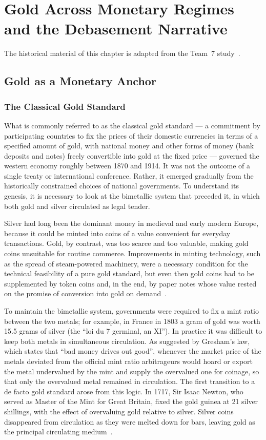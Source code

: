 \chapter{Gold Across Monetary Regimes and the Debasement Narrative}
\label{ch:gold-regimes}
The historical material of this chapter is adapted from the Team~7 study~\cite{team7}.

\section{Gold as a Monetary Anchor}
\subsection{The Classical Gold Standard}
What is commonly referred to as the classical gold standard --- a commitment by participating countries to fix the prices of their domestic currencies in terms of a specified amount of gold, with national money and other forms of money (bank deposits and notes) freely convertible into gold at the fixed price --- governed the western economy roughly between 1870 and 1914. It was not the outcome of a single treaty or international conference. Rather, it emerged gradually from the historically constrained choices of national governments. To understand its genesis, it is necessary to look at the bimetallic system that preceded it, in which both gold and silver circulated as legal tender.
 
Silver had long been the dominant money in medieval and early modern Europe, because it could be minted into coins of a value convenient for everyday transactions. Gold, by contrast, was too scarce and too valuable, making gold coins unsuitable for routine commerce. Improvements in minting technology, such as the spread of steam-powered machinery, were a necessary condition for the technical feasibility of a pure gold standard, but even then gold coins had to be supplemented by token coins and, in the end, by paper notes whose value rested on the promise of conversion into gold on demand~\cite{Eichengreen1996}.
 
To maintain the bimetallic system, governments were required to fix a mint ratio between the two metals; for example, in France in 1803 a gram of gold was worth 15.5 grams of silver (the ``loi du 7 germinal, an XI''). In practice it was difficult to keep both metals in simultaneous circulation. As suggested by Gresham's law, which states that ``bad money drives out good'', whenever the market price of the metals deviated from the official mint ratio arbitrageurs would hoard or export the metal undervalued by the mint and supply the overvalued one for coinage, so that only the overvalued metal remained in circulation. The first transition to a de facto gold standard arose from this logic. In 1717, Sir Isaac Newton, who served as Master of the Mint for Great Britain, fixed the gold guinea at 21 silver shillings, with the effect of overvaluing gold relative to silver. Silver coins disappeared from circulation as they were melted down for bars, leaving gold as the principal circulating medium~\cite{BordoKydland1995}.
 
